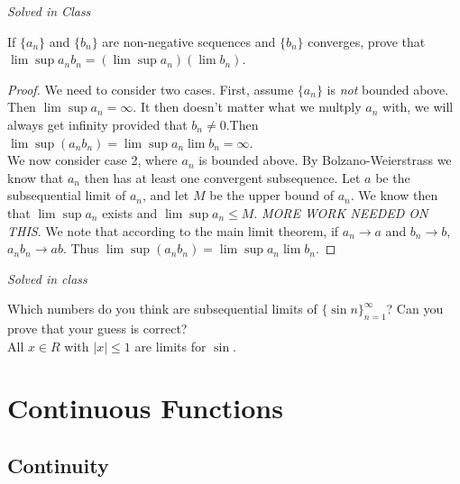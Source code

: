 \documentclass[12pt]{book}
\newenvironment{exercise}[2][Exercise]{\begin{trivlist}
\item[\hskip \labelsep {\bfseries #1}\hskip \labelsep {\bfseries #2.}]}{\end{trivlist}}
\begin{document}
\begin{exercise}{2.6.7}
\emph{Solved in Class}
\end{exercise}

\begin{exercise}{2.6.8}
If $\{a_n\}$ and $\{b_n\}$ are non-negative sequences and $\{b_n\}$ converges, prove that $\lim \sup a_n b_n= (\lim \sup a_n) (\lim b_n)$.

	\begin{proof}
	We need to consider two cases. First, assume $\{a_n\}$ is \emph{not} bounded above. Then $\lim \sup a_n  = \infty$. It then doesn't matter what we multply $a_n$ with, we will always get infinity provided that $b_n \neq 0$.Then $\lim \sup (a_n b_n) = \lim \sup a_n \lim b_n = \infty$. \\
	We now consider case 2, where $a_n$ is bounded above. By Bolzano-Weierstrass we know that $a_n$ then has at least one convergent subsequence. Let $a$ be the subsequential limit of $a_n$, and let $M$ be the upper bound of $a_n$. We know then that $\lim \sup a_n$ exists and $\lim \sup a_n \leq M$. \emph{MORE WORK NEEDED ON THIS}. We note that according to the main limit theorem, if $a_n \to a$ and $b_n \to b$, $a_n b_n \to a b$. Thus $\lim \sup (a_n b_n) = \lim \sup a_n \lim b_n$.
	\end{proof}
\end{exercise}


\begin{exercise}{2.6.9}
\emph{Solved in class}
\end{exercise}


\begin{exercise}{2.6.12}
Which numbers do you think are subsequential limits of $\{ \sin n\}_{n=1}^\infty$? Can you prove that your guess is correct? \\

All $x \in R$ with $|x| \leq 1$ are limits for $\sin$.
\end{exercise}



\chapter{Continuous Functions}
\section{Continuity}
\end{document}
